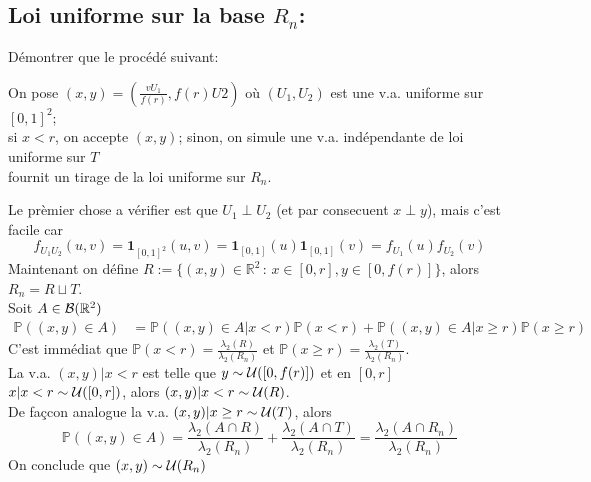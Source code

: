 \documentclass[a4paper]{article}
\begin{document}
\subsection{Loi uniforme sur la base $R_n$:} 

D\'emontrer que le proc\'ed\'e suivant:

On pose $(x,y) = \left(\frac{vU_1}{f(r)},f(r)U2\right)$ o\`u $(U_1,U_2)$ est une v.a. uniforme sur $[0,1]^2$;\\si $x<r$, on accepte $(x,y)$; sinon, on simule une v.a. ind\'ependante de loi uniforme sur $T$
\\fournit un tirage de la loi uniforme sur $R_n$.

Le pr\`emier chose a v\'erifier est que $U_1\perp U_2$ (et par consecuent $x\perp y$), mais c'est facile car
$$f_{U_1U_2}(u,v) = \mathbf{1}_{[0,1]^2}(u,v) = \mathbf{1}_{[0,1]}(u)\mathbf{1}_{[0,1]}(v) = f_{U_1}(u)f_{U_2}(v)$$
Maintenant on d\'efine $R := \{(x,y)\in\mathbb{R}^2\,:\,x\in[0,r],y\in[0,f(r)]\}$, alors $R_n = R\sqcup T$.
\\Soit $A\in{\cal B}(\mathbb{R}^2)$
\begin{align*}
\mathbb{P}((x,y)\in A) &= \mathbb{P}((x,y)\in A|x<r)\mathbb{P}(x<r) + \mathbb{P}((x,y)\in A|x\geq r)\mathbb{P}(x\geq r)
\end{align*}
C'est imm\'ediat que $\mathbb{P}(x<r) = \frac{\lambda_2(R)}{\lambda_2(R_n)}$ et $\mathbb{P}(x\geq r) = \frac{\lambda_2(T)}{\lambda_2(R_n)}$.\\La v.a. $(x,y)|x<r$ est telle que $y\sim{\cal U}([0,f(r)])$ et en $[0,r]$ $x|x<r\sim{\cal U}([0,r])$, alors $(x,y)|x<r\sim{\cal U}(R)$.
\\De fa\c{c}con analogue la v.a. $(x,y)|x\geq r\sim{\cal U}(T)$, alors
$$\mathbb{P}((x,y)\in A) = \frac{\lambda_2(A\cap R)}{\lambda_2(R_n)}+\frac{\lambda_2(A\cap T)}{\lambda_2(R_n)} = \frac{\lambda_2(A\cap R_n)}{\lambda_2(R_n)}$$
On conclude que $(x,y)\sim{\cal U}(R_n)$
\end{document}
